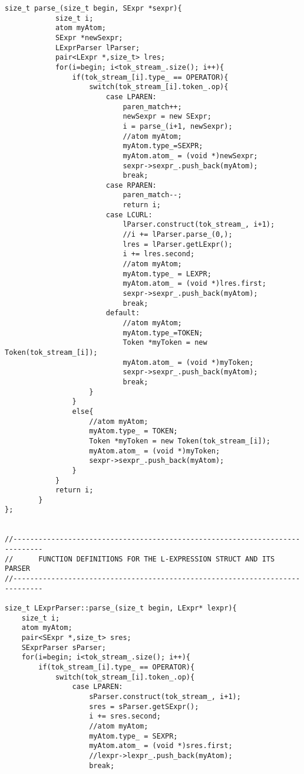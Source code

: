 \documentclass[pdftex,12pt,letterpaper,notitlepage,twoside]{article}
\begin{document}
\begin{lstlisting}[frame=single,caption={C program for testing}]
        size_t parse_(size_t begin, SExpr *sexpr){
            size_t i;
            atom myAtom;
            SExpr *newSexpr;
            LExprParser lParser;
            pair<LExpr *,size_t> lres;
            for(i=begin; i<tok_stream_.size(); i++){
                if(tok_stream_[i].type_ == OPERATOR){
                    switch(tok_stream_[i].token_.op){
                        case LPAREN:    
                            paren_match++;
                            newSexpr = new SExpr;
                            i = parse_(i+1, newSexpr);
                            //atom myAtom;
                            myAtom.type_=SEXPR;
                            myAtom.atom_ = (void *)newSexpr;
                            sexpr->sexpr_.push_back(myAtom);
                            break;
                        case RPAREN:
                            paren_match--;
                            return i;
                        case LCURL:
                            lParser.construct(tok_stream_, i+1);
                            //i += lParser.parse_(0,);
                            lres = lParser.getLExpr();
                            i += lres.second;
                            //atom myAtom;
                            myAtom.type_ = LEXPR;
                            myAtom.atom_ = (void *)lres.first;
                            sexpr->sexpr_.push_back(myAtom);
                            break;
                        default:
                            //atom myAtom;
                            myAtom.type_=TOKEN;
                            Token *myToken = new Token(tok_stream_[i]);
                            myAtom.atom_ = (void *)myToken;
                            sexpr->sexpr_.push_back(myAtom);
                            break;
                    }
                }
                else{
                    //atom myAtom;
                    myAtom.type_ = TOKEN;
                    Token *myToken = new Token(tok_stream_[i]);
                    myAtom.atom_ = (void *)myToken;
                    sexpr->sexpr_.push_back(myAtom);
                }
            }
            return i;
        }
};


//-----------------------------------------------------------------------------
//      FUNCTION DEFINITIONS FOR THE L-EXPRESSION STRUCT AND ITS PARSER
//-----------------------------------------------------------------------------

size_t LExprParser::parse_(size_t begin, LExpr* lexpr){
    size_t i;
    atom myAtom;
    pair<SExpr *,size_t> sres;
    SExprParser sParser;
    for(i=begin; i<tok_stream_.size(); i++){
        if(tok_stream_[i].type_ == OPERATOR){
            switch(tok_stream_[i].token_.op){
                case LPAREN:
                    sParser.construct(tok_stream_, i+1);
                    sres = sParser.getSExpr();
                    i += sres.second;
                    //atom myAtom;
                    myAtom.type_ = SEXPR;
                    myAtom.atom_ = (void *)sres.first;
                    //lexpr->lexpr_.push_back(myAtom);
                    break;


\end{lstlisting}
\end{document}
